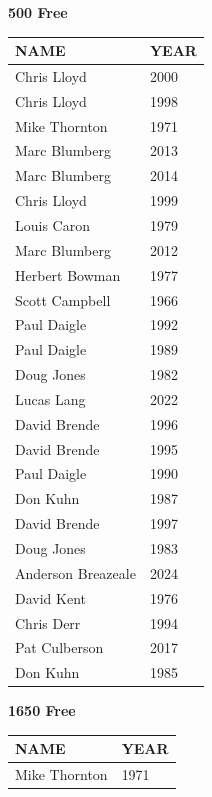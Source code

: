 \begin{table}[H]
\centering
\begin{minipage}[t]{0.48\textwidth}
\centering
\textbf{500 Free}\\[0.1cm]
\begin{tabular}{@{}p{2.8cm}p{1.2cm}@{}}
\hline
    \textbf{NAME} & \textbf{YEAR} \\
\hline
    Chris Lloyd & 2000 \\
    Chris Lloyd & 1998 \\
    Mike Thornton & 1971 \\
    Marc Blumberg & 2013 \\
    Marc Blumberg & 2014 \\
    Chris Lloyd & 1999 \\
    Louis Caron & 1979 \\
    Marc Blumberg & 2012 \\
    Herbert Bowman & 1977 \\
    Scott Campbell & 1966 \\
    Paul Daigle & 1992 \\
    Paul Daigle & 1989 \\
    Doug Jones & 1982 \\
    Lucas Lang & 2022 \\
    David Brende & 1996 \\
    David Brende & 1995 \\
    Paul Daigle & 1990 \\
    Don Kuhn & 1987 \\
    David Brende & 1997 \\
    Doug Jones & 1983 \\
    Anderson Breazeale & 2024 \\
    David Kent & 1976 \\
    Chris Derr & 1994 \\
    Pat Culberson & 2017 \\
    Don Kuhn & 1985 \\
\hline
\end{tabular}
\end{minipage}\hfill
\begin{minipage}[t]{0.48\textwidth}
\centering
\textbf{1650 Free}\\[0.1cm]
\begin{tabular}{@{}p{2.8cm}p{1.2cm}@{}}
\hline
    \textbf{NAME} & \textbf{YEAR} \\
\hline
    Mike Thornton & 1971 \\

\end{tabular}
\end{minipage}
\end{table}
